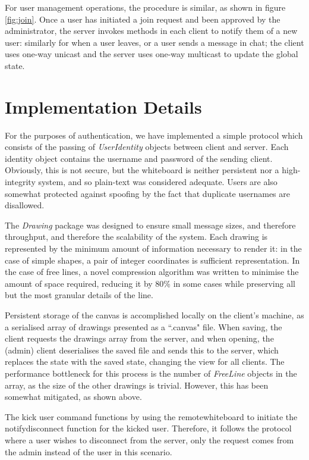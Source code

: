 \documentclass[12pt,a4paper]{article}
\begin{document}
For user management operations, the procedure is similar, as shown in figure \ref{fig:join}. Once a user has initiated a join request and been approved by the administrator, the server invokes methods in each client to notify them of a new user: similarly for when a user leaves, or a user sends a message in chat; the client uses one-way unicast and the server uses one-way multicast to update the global state. 


\section{Implementation Details}

For the purposes of authentication, we have implemented a simple protocol which consists of the passing of \textit{UserIdentity} objects between client and server. Each identity object contains the username and password of the sending client. Obviously, this is not secure, but the whiteboard is neither persistent nor a high-integrity system, and so plain-text was considered adequate. Users are also somewhat protected against spoofing by the fact that duplicate usernames are disallowed.

The \textit{Drawing} package was designed to ensure small message sizes, and therefore throughput, and therefore the scalability of the system. Each drawing is represented by the minimum amount of information necessary to render it: in the case of simple shapes, a pair of integer coordinates is sufficient representation. In the case of free lines, a novel compression algorithm was written to minimise the amount of space required, reducing it by 80\% in some cases while preserving all but the most granular details of the line. 

Persistent storage of the canvas is accomplished locally on the client's machine, as a serialised array of drawings presented as a ``.canvas" file. When saving, the client requests the drawings array from the server, and when opening, the (admin) client deserialises the saved file and sends this to the server, which replaces the state with the saved state, changing the view for all clients. The performance bottleneck for this process is the number of \textit{FreeLine} objects in the array, as the size of the other drawings is trivial. However, this has been somewhat mitigated, as shown above.

The kick user command functions by using the remotewhiteboard to initiate the notifydisconnect function for the kicked user. Therefore, it follows the protocol where a user wishes to disconnect from the server, only the request comes from the admin instead of the user in this scenario.
\end{document}
